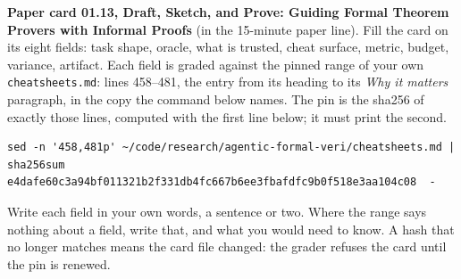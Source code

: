 \documentclass[11pt]{article}
\begin{document}
\begin{problem}\label{prob:B2}
\textbf{Paper card 01.13, Draft, Sketch, and Prove: Guiding Formal Theorem
Provers with Informal Proofs} (in the 15-minute paper line). Fill the card on
its eight fields: task shape, oracle, what is trusted, cheat surface, metric,
budget, variance, artifact. Each field is graded against the pinned range of
your own \texttt{cheatsheets.md}: lines 458--481, the entry from its heading
to its \emph{Why it matters} paragraph, in the copy the command below names.
The pin is the sha256 of exactly those lines, computed with the first line
below; it must print the second.
{\small
\begin{verbatim}
sed -n '458,481p' ~/code/research/agentic-formal-veri/cheatsheets.md | sha256sum
e4dafe60c3a94bf011321b2f331db4fc667b6ee3fbafdfc9b0f518e3aa104c08  -
\end{verbatim}
}
Write each field in your own words, a sentence or two. Where the range says
nothing about a field, write that, and what you would need to know. A hash
that no longer matches means the card file changed: the grader refuses the
card until the pin is renewed.
\end{problem}
\end{document}
